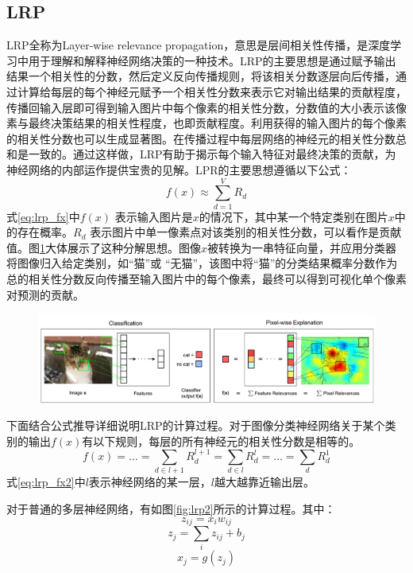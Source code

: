 \subsection{LRP}
LRP全称为Layer-wise relevance propagation，意思是层间相关性传播，是深度学习中用于理解和解释神经网络决策的一种技术。LRP的主要思想是通过赋予输出结果一个相关性的分数，然后定义反向传播规则，将该相关分数逐层向后传播，通过计算给每层的每个神经元赋予一个相关性分数来表示它对输出结果的贡献程度，传播回输入层即可得到输入图片中每个像素的相关性分数，分数值的大小表示该像素与最终决策结果的相关性程度，也即贡献程度。利用获得的输入图片的每个像素的相关性分数也可以生成显著图。在传播过程中每层网络的神经元的相关性分数总和是一致的。通过这样做，LRP有助于揭示每个输入特征对最终决策的贡献，为神经网络的内部运作提供宝贵的见解。LPR的主要思想遵循以下公式：
\begin{equation}
	f(x)\approx \sum_{d=1}^{V} R_d
	\label{eq:lrp_fx}
\end{equation}
式\ref{eq:lrp_fx}中$f(x)$ 表示输入图片是$x$的情况下，其中某一个特定类别在图片$x$中的存在概率。$R_d$ 表示图片中单一像素点对该类别的相关性分数，可以看作是贡献值。图\ref{fig:lrp1}大体展示了这种分解思想。图像$x$被转换为一串特征向量，并应用分类器将图像归入给定类别，如“猫”或 “无猫”，该图中将“猫”的分类结果概率分数作为总的相关性分数反向传播至输入图片中的每个像素，最终可以得到可视化单个像素对预测的贡献。
\begin{figure}[h]
	\centering 
	\includegraphics[width=15cm]{fig/ch2/lrp1.png}
	\label{fig:lrp1}
\end{figure}

下面结合公式推导详细说明LRP的计算过程。对于图像分类神经网络关于某个类别的输出$f(x)$有以下规则，每层的所有神经元的相关性分数是相等的。
\begin{equation}
	f(x)=\ldots=\sum_{d \in l+1} R_{d}^{l+1}=\sum_{d \in l} R_{d}^{l}=\ldots=\sum_{d} R_{d}^{1}
	\label{eq:lrp_fx2}
\end{equation}
式\ref{eq:lrp_fx2}中$l$表示神经网络的某一层，$l$越大越靠近输出层。

对于普通的多层神经网络，有如图\ref{fig:lrp2}所示的计算过程。其中：
\begin{equation}
	z_{ij}=x_iw_{ij}
	\label{eq:lrp_zij}
\end{equation}
\vspace{-0.5cm}
\begin{equation}
	z_{j}=\sum_i z_{ij}+b_j
	\label{eq:lrp_zj}
\end{equation}
\vspace{-0.5cm}
\begin{equation}
	x_j=g(z_{j})
	\label{eq:lrp_xj}
\end{equation}

